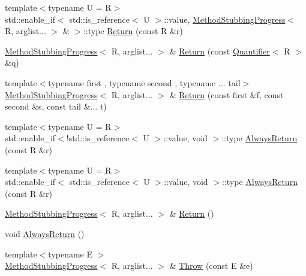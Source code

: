 \begin{DoxyCompactItemize}
\item 
{\footnotesize template$<$typename U  = R$>$ }\\std\+::enable\+\_\+if$<$ std\+::is\+\_\+reference$<$ U $>$\+::value, \mbox{\hyperlink{structfakeit_1_1MethodStubbingProgress}{Method\+Stubbing\+Progress}}$<$ R, arglist... $>$ \& $>$\+::type \mbox{\hyperlink{structfakeit_1_1MethodStubbingProgress_ab20141c6f552c3aa3399660c520c2ba4}{Return}} (const R \&r)
\item 
\mbox{\hyperlink{structfakeit_1_1MethodStubbingProgress}{Method\+Stubbing\+Progress}}$<$ R, arglist... $>$ \& \mbox{\hyperlink{structfakeit_1_1MethodStubbingProgress_acb4d4db8208a8eaadff77e7cbf3775db}{Return}} (const \mbox{\hyperlink{structfakeit_1_1Quantifier}{Quantifier}}$<$ R $>$ \&q)
\item 
{\footnotesize template$<$typename first , typename second , typename ... tail$>$ }\\\mbox{\hyperlink{structfakeit_1_1MethodStubbingProgress}{Method\+Stubbing\+Progress}}$<$ R, arglist... $>$ \& \mbox{\hyperlink{structfakeit_1_1MethodStubbingProgress_ae8417ec5f29f70be1ae914755b05e4db}{Return}} (const first \&f, const second \&s, const tail \&... t)
\item 
{\footnotesize template$<$typename U  = R$>$ }\\std\+::enable\+\_\+if$<$!std\+::is\+\_\+reference$<$ U $>$\+::value, void $>$\+::type \mbox{\hyperlink{structfakeit_1_1MethodStubbingProgress_a268ca122b518c0a34e80535d8f457549}{Always\+Return}} (const R \&r)
\item 
{\footnotesize template$<$typename U  = R$>$ }\\std\+::enable\+\_\+if$<$ std\+::is\+\_\+reference$<$ U $>$\+::value, void $>$\+::type \mbox{\hyperlink{structfakeit_1_1MethodStubbingProgress_a84cf6a4bf307cf8d49efb69b014e9b11}{Always\+Return}} (const R \&r)
\item 
\mbox{\hyperlink{structfakeit_1_1MethodStubbingProgress}{Method\+Stubbing\+Progress}}$<$ R, arglist... $>$ \& \mbox{\hyperlink{structfakeit_1_1MethodStubbingProgress_a4743b7e25e98cd6a2be2c03b7a9416d4}{Return}} ()
\item 
void \mbox{\hyperlink{structfakeit_1_1MethodStubbingProgress_a3f1ecf87f8c73b7f3276786914579f8b}{Always\+Return}} ()
\item 
{\footnotesize template$<$typename E $>$ }\\\mbox{\hyperlink{structfakeit_1_1MethodStubbingProgress}{Method\+Stubbing\+Progress}}$<$ R, arglist... $>$ \& \mbox{\hyperlink{structfakeit_1_1MethodStubbingProgress_ae3da30d02ba5de4bfa82f51bba5602c3}{Throw}} (const E \&e)

\end{DoxyCompactItemize}
